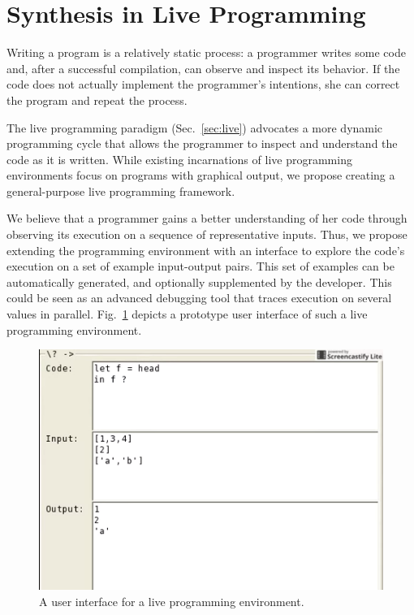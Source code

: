 \section{Synthesis in Live Programming}
\label{sec:goal}

Writing a program is a relatively static process: a programmer writes some code and, after a successful compilation, can observe and inspect its behavior. If the code does not actually implement the programmer's intentions, she can correct the program and repeat the process.

The live programming paradigm (Sec.~\ref{sec:live}) advocates a more dynamic programming cycle that allows the programmer to inspect and understand the code as it is written. While existing incarnations of live programming environments focus on programs with graphical output, we propose creating a general-purpose live programming framework.

We believe that a programmer gains a better understanding of her code through observing its execution on a sequence of representative inputs. Thus, we propose extending the programming environment with an interface to explore the code's execution on a set of example input-output pairs. This set of examples can be automatically generated, and optionally supplemented by the developer. This could be seen as an advanced debugging tool that traces execution on several values in parallel. Fig.~\ref{fig:tool} depicts a prototype user interface of such a live programming environment.

\begin{figure}[h!]
\centering
\includegraphics[scale=0.5]{tool}
\caption{A user interface for a live programming environment.}
\label{fig:tool}
\end{figure}

